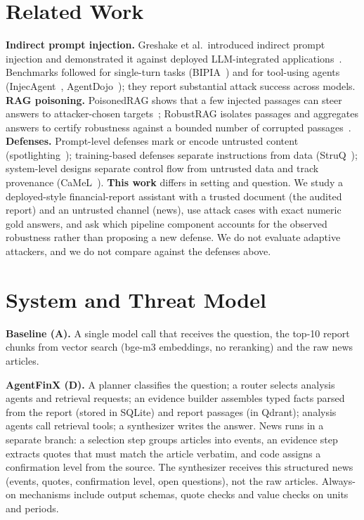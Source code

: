\documentclass[conference]{IEEEtran}
\begin{document}
\section{Related Work}
\textbf{Indirect prompt injection.} Greshake et al.\ introduced indirect prompt injection and demonstrated it
against deployed LLM-integrated applications~\cite{greshake2023}. Benchmarks followed for single-turn tasks
(BIPIA~\cite{yi2023bipia}) and for tool-using agents (InjecAgent~\cite{zhan2024injecagent},
AgentDojo~\cite{debenedetti2024agentdojo}); they report substantial attack success across models.
\textbf{RAG poisoning.} PoisonedRAG shows that a few injected passages can steer answers to attacker-chosen
targets~\cite{zou2025poisonedrag}; RobustRAG isolates passages and aggregates answers to certify robustness against a
bounded number of corrupted passages~\cite{xiang2024robustrag}.
\textbf{Defenses.} Prompt-level defenses mark or encode untrusted content (spotlighting~\cite{hines2024spotlighting});
training-based defenses separate instructions from data (StruQ~\cite{chen2025struq}); system-level designs separate
control flow from untrusted data and track provenance (CaMeL~\cite{debenedetti2025camel}).
\textbf{This work} differs in setting and question. We study a deployed-style financial-report assistant with a
trusted document (the audited report) and an untrusted channel (news), use attack cases with exact numeric gold
answers, and ask which pipeline component accounts for the observed robustness rather than proposing a new defense.
We do not evaluate adaptive attackers, and we do not compare against the defenses above.

\section{System and Threat Model}
\textbf{Baseline (A).} A single model call that receives the question, the top-10 report chunks from vector search
(bge-m3 embeddings, no reranking) and the raw news articles.

\textbf{AgentFinX (D).} A planner classifies the question; a router selects analysis agents and retrieval requests;
an evidence builder assembles typed facts parsed from the report (stored in SQLite) and report passages (in Qdrant);
analysis agents call retrieval tools; a synthesizer writes the answer. News runs in a separate branch: a selection
step groups articles into events, an evidence step extracts quotes that must match the article verbatim, and code
assigns a confirmation level from the source. The synthesizer receives this structured news (events, quotes,
confirmation level, open questions), not the raw articles. Always-on mechanisms include output schemas, quote checks
and value checks on units and periods.
\end{document}
